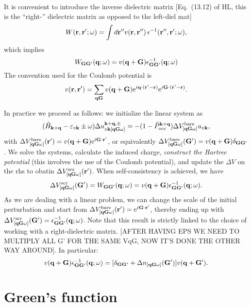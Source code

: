 \documentclass[twocolumn,prb,showpacs,superscriptaddress]{revtex4}
\def\w{\omega}
\def\H{\hat{H}}
\def\P{\hat{P}_{\rm occ}}
\def\E{\varepsilon}
\def\q{{\bf q}}
\def\k{{\bf k}}
\def\G{{\bf G}}
\def\Gp{{\bf G^\prime}}
\def\r{{\bf r}}
\def\rp{{\bf r^\prime}}
\def\rpp{{\bf r^{\prime\prime}}}
\begin{document}
It is convenient to introduce the inverse dielectric matrix [Eq.\ (13.12) of HL,
this is the ``right-'' dielectric matrix as opposed to the left-diel mat]
  \begin{equation}
  W(\r,\rp;\w) = \int d\rpp v(\r,\rpp) \, \epsilon^{-1}(\rpp,\rp;\w),
  \end{equation}
which implies
  \begin{equation}
  W_{\G\Gp}(\q;\w) = v(\q+\G)  \epsilon^{-1}_{\G\Gp}(\q;\w)  
  \end{equation}
The convention used for the Coulomb potential is
  \begin{equation}
  v(\r,\rp) = \sum_{\q\G} v(\q+\G) {\rm e}^{i\q\cdot(\rp-\r)} {\rm e}^{i\G\cdot(\rp-\r)}.
  \end{equation}

In practice we proceed as follows: we initialize the linear system as
  \begin{equation}
  (\H_{\k+\q}-\E_{v\k}\pm\w) \Delta u^{\k+\q,\pm}_{v\k[\q\G\w]}  = -(1-\P^{\k+\q}) \Delta V^{\rm bare}_{[\q\G\w]} u_{v\k},
  \end{equation}
with $\Delta V^{\rm bare}_{[\q\G\w]}(\rp) = v(\q+\G) {\rm e}^{i\G\cdot\rp}$, or
equivalently $\Delta V^{\rm bare}_{[\q\G\w]}(\Gp) = v(\q+\G)\delta_{\G\Gp}$.
We solve the systems, calculate the induced charge, {\it construct the Hartree potential}
(this involves the use of the Coulomb potential), and update the $\Delta V$ on the rhs
to obatin $\Delta V^{\rm scr}_{[\q\G\w]}(\rp)$. When self-consistency is achieved, we have
  \begin{equation}
  \Delta V^{\rm scr}_{[\q\G\w]}(\Gp) = W_{\G\Gp}(\q;\w) = v(\q+\G) \epsilon^{-1}_{\G\Gp}(\q;\w).
  \end{equation}
As we are dealing with a linear problem, we can change the scale of the initial
perturbation and start from $\Delta V^{\rm bare}_{[\q\G\w]}(\rp) = {\rm e}^{i\G\cdot\rp}$,
thereby ending up with $\Delta V^{\rm scr}_{[\q\G\w]}(\Gp) = \epsilon^{-1}_{\G\Gp}(\q;\w)$.
Note that this result is strictly linked to the choice of working with a right-dielectric
matrix. [AFTER HAVING EPS WE NEED TO MULTIPLY ALL G' FOR THE SAME VqG, NOW IT'S DONE
THE OTHER WAY AROUND]. In particular:
  \begin{equation}
  v(\q+\G)  \epsilon^{-1}_{\G\Gp}(\q;\w) =[\delta_{\G\Gp} + \Delta n_{[\q\G\w]}(\Gp) ]v(\q+\Gp).
  \end{equation}




\section{Green's function}
\end{document}
